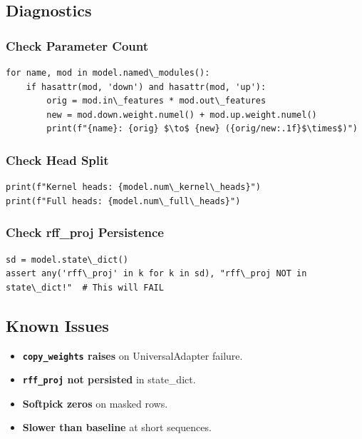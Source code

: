 \subsection{Diagnostics}

\subsubsection{Check Parameter Count}

\begin{lstlisting}
for name, mod in model.named\_modules():
    if hasattr(mod, 'down') and hasattr(mod, 'up'):
        orig = mod.in\_features * mod.out\_features
        new = mod.down.weight.numel() + mod.up.weight.numel()
        print(f"{name}: {orig} $\to$ {new} ({orig/new:.1f}$\times$)")
\end{lstlisting}

\subsubsection{Check Head Split}

\begin{lstlisting}
print(f"Kernel heads: {model.num\_kernel\_heads}")
print(f"Full heads: {model.num\_full\_heads}")
\end{lstlisting}

\subsubsection{Check rff\_proj Persistence}

\begin{lstlisting}
sd = model.state\_dict()
assert any('rff\_proj' in k for k in sd), "rff\_proj NOT in state\_dict!"  # This will FAIL
\end{lstlisting}

\subsection{Known Issues}

\begin{itemize}
\item \textbf{\texttt{copy\_weights} raises} on UniversalAdapter failure.
\item \textbf{\texttt{rff\_proj} not persisted} in state\_dict.
\item \textbf{Softpick zeros} on masked rows.
\item \textbf{Slower than baseline} at short sequences.

\end{itemize}
